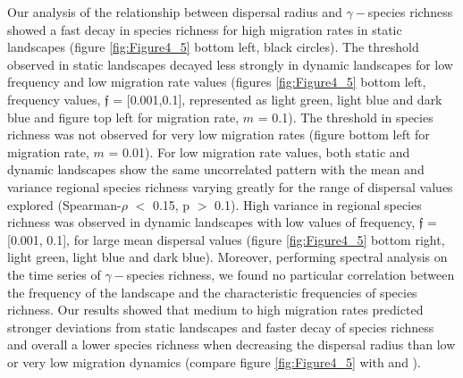 \documentclass[a4paper,12pt]{article}
\begin{document}
Our analysis of the relationship between dispersal radius and $\gamma-$species richness showed a fast decay in species richness for high migration rates in static landscapes (figure \ref{fig:Figure4_5} bottom left, black circles). The threshold observed in static landscapes decayed less strongly in dynamic landscapes for low frequency and low migration rate values (figures \ref{fig:Figure4_5} bottom left, frequency values, $\mathfrak{f}$ = [0.001,0.1], represented as light green, light blue and dark blue and figure  top left for migration rate, $m$ = 0.1). The threshold in species richness was not observed for very low migration rates (figure  bottom left for migration rate, $m$ = 0.01). For low migration rate values, both static and dynamic landscapes show the same uncorrelated pattern with the mean and variance regional species richness varying greatly for the range of dispersal values explored (Spearman-$\rho$ $<$ 0.15, p $>$ 0.1). High variance in regional species richness was observed in dynamic landscapes with low values of frequency, $\mathfrak{f}$ = [0.001, 0.1], for large mean dispersal values (figure \ref{fig:Figure4_5} bottom right, light green, light blue and dark blue). Moreover, performing spectral analysis on the time series of $\gamma-$species richness, we found no particular correlation between the frequency of the landscape and the characteristic frequencies of species richness. Our results showed that medium to high migration rates predicted stronger deviations from static landscapes and faster decay of species richness and overall a lower species richness when decreasing the dispersal radius than low or very low migration dynamics (compare figure \ref{fig:Figure4_5} with  and ).  
\end{document}
